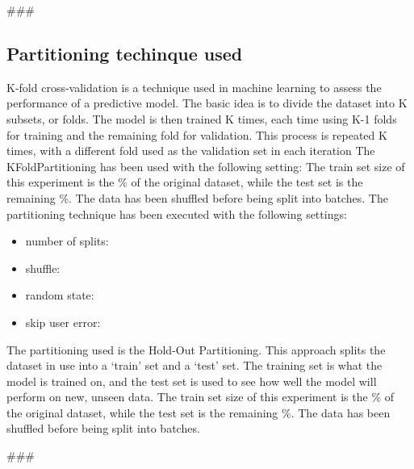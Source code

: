 
###


\subsection{Partitioning techinque used}\label{subsec:partitioning}
K-fold cross-validation is a technique used in machine learning to assess
the performance of a predictive model. The basic idea is to divide the dataset
into K subsets, or folds. The model is then trained K times, each time using K-1
folds for training and the remaining fold for validation. This process is
repeated K times, with a different fold used as the validation set in each iteration
\hfill\break
\hfill\break
The KFoldPartitioning has been used with the following setting:
\hfill\break
\hfill\break
The train set size of this experiment is the \%
of the original dataset, while the test set is the remaining \%.
\hfill\break
\hfill\break
{}
The data has been shuffled before being split into batches.
The partitioning technique has been executed with the following settings:
\begin{itemize}
    \item number of splits: 
    \item shuffle: 
    \item random state: 
    \item skip user error: 
\end{itemize}

The partitioning used is the Hold-Out Partitioning.
This approach splits the dataset in use into a ‘train’ set and a ‘test’ set.
The training set is what the model is trained on, and the test set is used to see how
well the model will perform on new, unseen data.
\hfill\break
\hfill\break
The train set size of this experiment is the \%
of the original dataset, while the test set is the remaining \%.
\hfill\break
\hfill\break
{}
The data has been shuffled before being split into batches.






###
